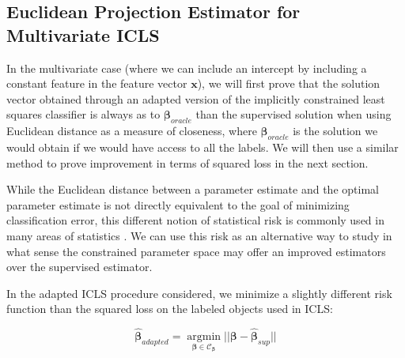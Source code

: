 \documentclass{llncs}
\begin{document}

\subsection{Euclidean Projection Estimator for Multivariate ICLS} \label{section:proofmultivariate}

In the multivariate case (where we can include an intercept by including a constant feature in the feature vector $\mathbf{x}$), we will first prove that the solution vector obtained through an adapted version of the implicitly constrained least squares classifier is always as to $\boldsymbol{\beta}_{oracle}$ than the supervised solution when using Euclidean distance as a measure of closeness, where $\boldsymbol{\beta}_{oracle}$ is the solution we would obtain if we would have access to all the labels. We will then use a similar method to prove improvement in terms of squared loss in the next section. 

While the Euclidean distance between a parameter estimate and the optimal parameter estimate is not directly equivalent to the goal of minimizing classification error, this different notion of statistical risk is commonly used in many areas of statistics \cite{Berger1985}. We can use this risk as an alternative way to study in what sense the constrained parameter space may offer an improved estimators over the supervised estimator.

In the adapted ICLS procedure considered, we minimize a slightly different risk function than the squared loss on the labeled objects used in ICLS:

\begin{equation} \label{eq:adaptedICLS}
\boldsymbol{\hat{\beta}}_{adapted} = \operatorname*{argmin}_{\boldsymbol{\beta} \in \mathcal{C}_{\boldsymbol{\beta}}}  ||\boldsymbol{\beta}-\boldsymbol{\hat{\beta}}_{sup}||
\end{equation}
\end{document}
